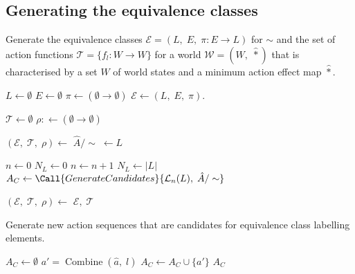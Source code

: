 \subsection{Generating the equivalence classes}

\begin{algorithm}
	\caption{
		Generate the equivalence classes $\mathcal{E} = (L, \; E, \; \pi: E \to L)$ for $\sim$ and the set of action functions $\mathcal{T} = \{f_{l}: W \to W\}$ for a world $\mathscr{W} = (W, \; \hat{\ast})$ that is characterised by a set $W$ of world states and a minimum action effect map $\hat{\ast}$.
	}
        \label{alg:GenerateEquivClasses}
	\hrulefill
	\begin{algorithmic}[1]
		\Statex {}
		\State $L \gets \emptyset$
		\State $E \gets \emptyset$
		\State $\pi \gets (\emptyset \to \emptyset)$
		\State $\mathcal{E} \gets (L, \; E, \; \pi)$.

		\Statex {}
		\State $\mathcal{T} \gets \emptyset$
		\State $\rho: \gets (\emptyset \to \emptyset)$

		\Statex {}
		\State $(\mathcal{E}, \; \mathcal{T}, \; \rho) \gets$ 
		\EndFor
		\State $\hat{A}/\sim \; \gets L$

		\Statex {}
		\State $n \gets 0$
		\State $N_{L} \gets 0$
		\Statex {}
		\State $n \gets n + 1$
		\State $N_{L} \gets |L|$
		\State $A_{C} \gets \Call{GenerateCandidates}{\mathcal{L}_{n}(L), \;  \hat{A}/\sim}$

		\State $(\mathcal{E}, \; \mathcal{T}, \; \rho) \gets$ 
		\EndFor
		\EndWhile
		\State \Return $\mathcal{E}, \; \mathcal{T}$
		\EndProcedure
	\end{algorithmic}
\end{algorithm}


\begin{algorithm}[H]
	\caption{
		Generate new action sequences that are candidates for equivalence class labelling elements.
	}
	\hrulefill
	\begin{algorithmic}[1]
		\State $A_{C} \gets \emptyset$
		\State $a' = \operatorname{Combine}(\hat{a}, \; l)$
		\State $A_{C} \gets A_{C} \cup \{a'\}$
		\EndFor
		\State \Return $A_{C}$
		\EndProcedure
	\end{algorithmic}
\end{algorithm}


